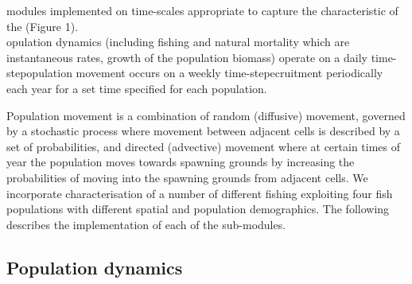 \documentclass[review]{elsarticle}
\begin{document}
 
modules  implemented on time-scales
appropriate to capture the characteristic of the  (Figure 1).  \\

opulation dynamics (including fishing and natural
mortality which are instantaneous rates, growth of the population biomass)
operate on a daily time-stepopulation movement
occurs on a weekly time-stepecruitment
 periodically each year for a set time
 specified for each
population.

Population movement is a combination of random (diffusive) movement, governed
by a stochastic process where movement between adjacent cells is described by a
set of probabilities, and directed (advective) movement where at certain times
of year the population moves towards spawning grounds by increasing the
probabilities of moving into the spawning grounds from adjacent cells. We
incorporate characterisation of a number of different fishing
 exploiting four fish populations with different
spatial and population demographics. The following describes the implementation
of each of the sub-modules.

\subsection{Population dynamics}
\end{document}
